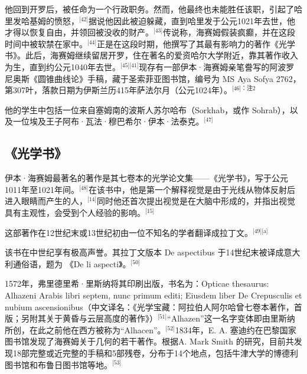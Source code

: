 他回到开罗后，被任命为一个行政职务。然而，他最终也未能胜任该职，引起了哈里发哈基姆的愤怒，\(^\text{[42]}\)据说他因此被迫躲藏，直到哈里发于公元1021年去世，他才得以恢复自由，并领回被没收的财产。\(^\text{[43]}\)传说称，海赛姆假装疯癫，并在这段时间中被软禁在家中。\(^\text{[44]}\)正是在这段时期，他撰写了其最有影响力的著作《光学书》。此后，海赛姆继续留居开罗，住在著名的爱资哈尔大学附近，靠其著作收入为生，直到约公元1040年去世。\(^\text{[45][41]}\)现存有一部伊本·海赛姆亲笔誊写的阿波罗尼奥斯《圆锥曲线论》手稿，藏于圣索菲亚图书馆，编号为 MS Aya Sofya 2762，第307叶，落款日期为伊斯兰历415年萨法尔月（公元1024年）。\(^\text{[46]：注2}\)

他的学生中包括一位来自塞姆南的波斯人苏尔哈布（Sorkhab，或作 Sohrab），以及一位埃及王子阿布·瓦法·穆巴希尔·伊本·法泰克。\(^\text{[47]}\)
\subsection{《光学书》}
伊本·海赛姆最著名的著作是其七卷本的光学论文集——《光学书》，写于公元1011年至1021年间。\(^\text{[48]}\)在该书中，他是第一个解释视觉是由于光线从物体反射后进入眼睛而产生的人，\(^\text{[14]}\)同时他还首次提出视觉是在大脑中形成的，并指出视觉具有主观性，会受到个人经验的影响。\(^\text{[15]}\)

这部著作在12世纪末或13世纪初由一位不知名的学者翻译成拉丁文。\(^\text{[49][a]}\)

该书在中世纪享有极高声誉。其拉丁文版本 De aspectibus 于14世纪末被译成意大利通俗语，题为 《De li aspecti》。\(^\text{[50]}\)

1572年，弗里德里希·里斯纳将其印刷出版，书名为：Opticae thesaurus: Alhazeni Arabis libri septem, nunc primum editi; Eiusdem liber De Crepusculis et nubium ascensionibus（中文译名：《光学宝藏：阿拉伯人阿尔哈曾七卷本著作，首版；另附其关于黄昏与云层高度的著作》）\(^\text{[51]}\)“Alhazen”这一名字变体即由里斯纳所创，在此之前他在西方被称为“Alhacen”。\(^\text{[52]}\)1834年，E. A. 塞迪约在巴黎国家图书馆发现了海赛姆关于几何的若干著作。根据A. Mark Smith 的研究，目前共发现18部完整或近完整的手稿和5部残卷，分布于14个地点，包括牛津大学的博德利图书馆和布鲁日图书馆等地。\(^\text{[53]}\)
